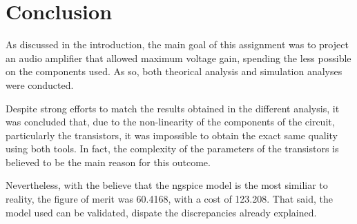 \pagebreak
\section{Conclusion}
\label{con}

\par As discussed in the introduction, the main goal of this assignment was to project an audio amplifier that allowed maximum voltage gain, spending the less possible on the components used. As so, both theorical analysis and simulation analyses were conducted. 

\par Despite strong efforts to match the results obtained in the different analysis, it was concluded that, due to the non-linearity of the components of the circuit, particularly the transistors, it was impossible to obtain the exact same quality using both tools. In fact, the complexity of the parameters of the transistors is believed to be the main reason for this outcome.

\par Nevertheless, with the believe that the ngspice model is the most similiar to reality, the figure of merit was 60.4168, with a cost of 123.208. That said, the model used can be validated, dispate the discrepancies already explained.

